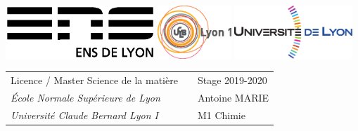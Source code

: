 \documentclass[11pt,a4paper]{article}
\begin{document}
\setlength{\parindent}{0pt}

\thispagestyle{empty}

\includegraphics[height=2cm]{logoens.eps} \hfill \includegraphics[height=2cm]{logoucbl.eps} \hfill \includegraphics[height=2cm]{logounivlyon.eps}
\vspace{0.5cm}

\begin{tabularx}{\textwidth}{@{} l X l @{} }
{\sc Licence / Master Science de la matière} & & Stage 2019-2020 \\
{\it École Normale Supérieure de Lyon} & & Antoine \textsc{MARIE} \\
{\it Université Claude Bernard Lyon I} & & M1 Chimie
\end{tabularx}
\end{document}

